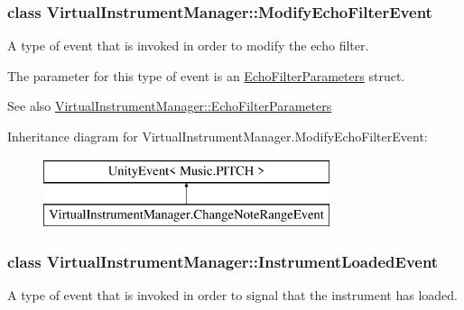 \subsubsection{class Virtual\+Instrument\+Manager\+:\+:Modify\+Echo\+Filter\+Event}
A type of event that is invoked in order to modify the echo filter. 

The parameter for this type of event is an \hyperlink{group___virtual_instrument_manager_struct_virtual_instrument_manager_1_1_echo_filter_parameters}{Echo\+Filter\+Parameters} struct.

\begin{DoxySeeAlso}{See also}
\hyperlink{group___virtual_instrument_manager_struct_virtual_instrument_manager_1_1_echo_filter_parameters}{Virtual\+Instrument\+Manager\+::\+Echo\+Filter\+Parameters} 
\end{DoxySeeAlso}
Inheritance diagram for Virtual\+Instrument\+Manager.\+Modify\+Echo\+Filter\+Event\+:\begin{figure}[H]
\begin{center}
\leavevmode
\includegraphics[height=2.000000cm]{group___virtual_instrument_manager}
\end{center}
\end{figure}
\label{class_virtual_instrument_manager_1_1_instrument_loaded_event}
\subsubsection{class Virtual\+Instrument\+Manager\+:\+:Instrument\+Loaded\+Event}
A type of event that is invoked in order to signal that the instrument has loaded. 

